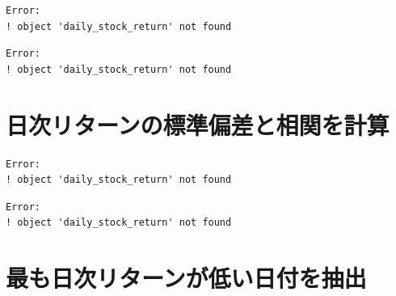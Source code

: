 \documentclass[
  letterpaper,
  DIV=11,
  numbers=noendperiod]{scrreprt}
\newenvironment{Shaded}{\begin{snugshade}}{\end{snugshade}}
\newcommand{\CommentTok}[1]{\textcolor[rgb]{0.37,0.37,0.37}{#1}}
\newcommand{\FunctionTok}[1]{\textcolor[rgb]{0.28,0.35,0.67}{#1}}
\newcommand{\NormalTok}[1]{\textcolor[rgb]{0.00,0.23,0.31}{#1}}
\newcommand{\SpecialCharTok}[1]{\textcolor[rgb]{0.37,0.37,0.37}{#1}}
\begin{document}
\begin{verbatim}
Error:
! object 'daily_stock_return' not found
\end{verbatim}

\begin{Shaded}
\end{Shaded}

\begin{verbatim}
Error:
! object 'daily_stock_return' not found
\end{verbatim}

\section{日次リターンの標準偏差と相関を計算}\label{ux65e5ux6b21ux30eaux30bfux30fcux30f3ux306eux6a19ux6e96ux504fux5deeux3068ux76f8ux95a2ux3092ux8a08ux7b97}

\begin{Shaded}
\end{Shaded}

\begin{verbatim}
Error:
! object 'daily_stock_return' not found
\end{verbatim}

\begin{Shaded}
\end{Shaded}

\begin{verbatim}
Error:
! object 'daily_stock_return' not found
\end{verbatim}

\section{最も日次リターンが低い日付を抽出}\label{ux6700ux3082ux65e5ux6b21ux30eaux30bfux30fcux30f3ux304cux4f4eux3044ux65e5ux4ed8ux3092ux62bdux51fa}
\end{document}
